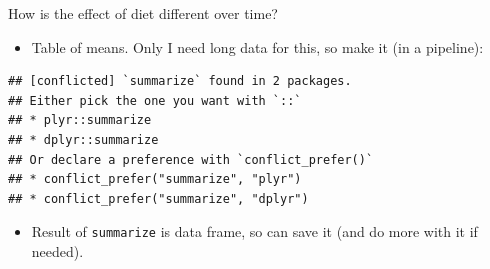 \documentclass[ignorenonframetext,]{beamer}
\newenvironment{Shaded}{\begin{snugshade}}{\end{snugshade}}
\newcommand{\DataTypeTok}[1]{\textcolor[rgb]{0.13,0.29,0.53}{#1}}
\newcommand{\KeywordTok}[1]{\textcolor[rgb]{0.13,0.29,0.53}{\textbf{#1}}}
\newcommand{\NormalTok}[1]{#1}
\newcommand{\OperatorTok}[1]{\textcolor[rgb]{0.81,0.36,0.00}{\textbf{#1}}}
\newcommand{\StringTok}[1]{\textcolor[rgb]{0.31,0.60,0.02}{#1}}
\providecommand{\tightlist}{%
  \setlength{\itemsep}{0pt}\setlength{\parskip}{0pt}}
\begin{document}
\begin{frame}[fragile]{How is the effect of diet different over time?}
\protect\hypertarget{how-is-the-effect-of-diet-different-over-time}{}

\begin{itemize}
\tightlist
\item
  Table of means. Only I need long data for this, so make it (in a
  pipeline):
\end{itemize}

\begin{Shaded}
\end{Shaded}

\begin{verbatim}
## [conflicted] `summarize` found in 2 packages.
## Either pick the one you want with `::` 
## * plyr::summarize
## * dplyr::summarize
## Or declare a preference with `conflict_prefer()`
## * conflict_prefer("summarize", "plyr")
## * conflict_prefer("summarize", "dplyr")
\end{verbatim}

\begin{itemize}
\tightlist
\item
  Result of \texttt{summarize} is data frame, so can save it (and do
  more with it if needed).
\end{itemize}

\end{frame}
\end{document}

